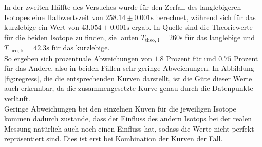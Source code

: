 In der zweiten Hälfte des Versuches wurde für den Zerfall des langlebigeren Isotopes %
eine Halbwertszeit von $258.14 \pm 0.001 \si{\s}$ berechnet, während sich für das kurzlebige ein Wert von $43.054 \pm 0.001 \si{\s}$ ergab. In Quelle %
sind die Theoriewerte für die beiden Isotope zu finden, sie lauten $T_{\text{theo, l}} = 260 \si{\s}$ für das langlebige und $T_{\text{theo, k}} = 42.3 \si{\s}$ für
das kurzlebige. \\
So ergeben sich prozentuale Abweichungen von $1.8$ Prozent für %
und $0.75$ Prozent für das Andere, also in beiden Fällen sehr geringe Abweichungen. In Abbildung \ref{fig:regress}, die die entsprechenden Kurven darstellt, ist die Güte dieser 
Werte auch erkennbar, da die zusammengesetzte Kurve genau durch die Datenpunkte verläuft. \\
Geringe Abweichungen bei den einzelnen Kuven für die jeweiligen Isotope kommen dadurch zustande, dass der Einfluss des andern Isotops bei der realen Messung natürlich auch noch
einen Einfluss hat, sodass die Werte nicht perfekt repräsentiert sind. Dies ist erst bei Kombination der Kurven der Fall. 